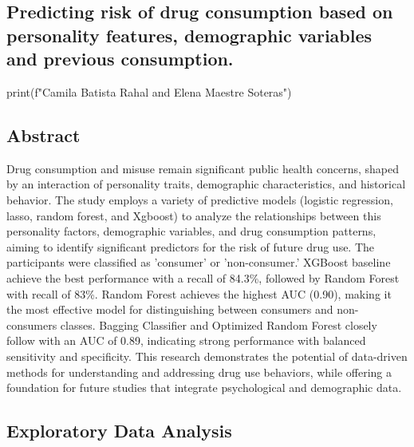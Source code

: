 \documentclass{article}
\begin{document}
\begin{center}
\section*{Predicting risk of drug consumption based on personality features, demographic variables and previous consumption.}

\begin{pycode}
print(f"Camila Batista Rahal and Elena Maestre Soteras")
\end{pycode}
\end{center}

\subsection*{Abstract}

Drug consumption and misuse remain significant public health concerns, shaped by an interaction of personality traits, demographic characteristics, and historical behavior. The study employs a variety of predictive models (logistic regression, lasso, random forest, and Xgboost) to analyze the relationships between this personality factors, demographic variables, and drug consumption patterns, aiming to identify significant predictors for the risk of future drug use. The participants were classified as 'consumer' or 'non-consumer.' XGBoost baseline achieve the best performance with a recall of 84.3\%, followed by Random Forest with recall of 83\%. Random Forest achieves the highest AUC (0.90), making it the most effective model for distinguishing between consumers and non-consumers classes. Bagging Classifier and Optimized Random Forest closely follow with an AUC of 0.89, indicating strong performance with balanced sensitivity and specificity. This research demonstrates the potential of data-driven methods for understanding and addressing drug use behaviors, while offering a foundation for future studies that integrate psychological and demographic data.

\subsection*{Exploratory Data Analysis}
\end{document}
